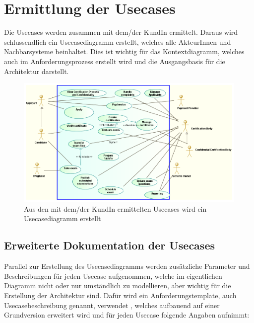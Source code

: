 \section{Ermittlung der Usecases}
Die Usecases werden zusammen mit dem/der KundIn ermittelt. Daraus wird schlussendlich ein Usecasediagramm erstellt, welches alle AkteurInnen und Nachbarsysteme beinhaltet. Dies ist wichtig für das Kontextdiagramm, welches auch im Anforderungsprozess erstellt wird und die Ausgangsbasis für die Architektur darstellt.

\begin{figure}[!htbp]
    \centering
    \includegraphics[scale=0.4]{uml/usecase.png}
    \caption{Aus den mit dem/der KundIn ermittelten Usecases wird ein Usecasediagramm erstellt}
\end{figure}

\subsection{Erweiterte Dokumentation der Usecases}
Parallel zur Erstellung des Usecasediagramms werden zusätzliche Parameter und Beschreibungen für jeden Usecase aufgenommen, welche im eigentlichen Diagramm nicht oder nur umständlich zu modellieren, aber wichtig für die Erstellung der Architektur sind.
Dafür wird ein Anforderungstemplate, auch Usecasebeschreibung genannt, verwendet \cite[S. 214]{reqman}, welches aufbauend auf einer Grundversion \cite[Abbildung 8.14, S. 215]{reqman} erweitert wird und für jeden Usecase folgende Angaben aufnimmt:

